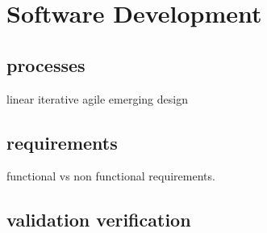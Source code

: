 \documentclass[\docroot/main]{subfiles}
\begin{document}
\chapter{Software Development}
\section{processes}
linear
iterative
agile
emerging design

\section{requirements}

functional vs non functional requirements.

\section{validation verification}
\end{document}
